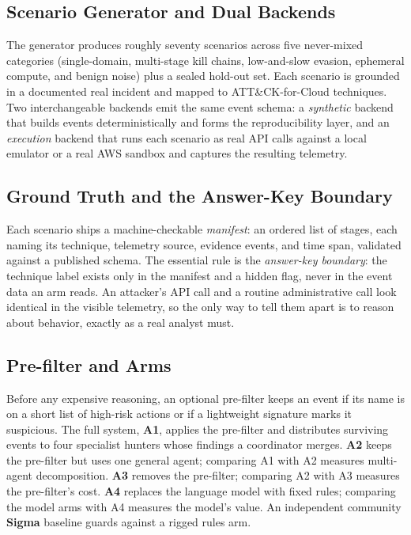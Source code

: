 \documentclass[journal]{IEEEtran}
\begin{document}
\subsection{Scenario Generator and Dual Backends}
The generator produces roughly seventy scenarios across five never-mixed categories (single-domain,
multi-stage kill chains, low-and-slow evasion, ephemeral compute, and benign noise) plus a sealed
hold-out set. Each scenario is grounded in a documented real incident and mapped to ATT\&CK-for-Cloud
techniques. Two interchangeable backends emit the same event schema: a \emph{synthetic} backend that
builds events deterministically and forms the reproducibility layer, and an \emph{execution} backend
that runs each scenario as real API calls against a local emulator or a real AWS sandbox and captures
the resulting telemetry.

\subsection{Ground Truth and the Answer-Key Boundary}
Each scenario ships a machine-checkable \emph{manifest}: an ordered list of stages, each naming its
technique, telemetry source, evidence events, and time span, validated against a published schema. The
essential rule is the \emph{answer-key boundary}: the technique label exists only in the manifest and
a hidden flag, never in the event data an arm reads. An attacker's API call and a routine
administrative call look identical in the visible telemetry, so the only way to tell them apart is to
reason about behavior, exactly as a real analyst must.

\subsection{Pre-filter and Arms}
Before any expensive reasoning, an optional pre-filter keeps an event if its name is on a short list
of high-risk actions or if a lightweight signature marks it suspicious. The full system, \textbf{A1},
applies the pre-filter and distributes surviving events to four specialist hunters whose findings a
coordinator merges. \textbf{A2} keeps the pre-filter but uses one general agent; comparing A1 with A2
measures multi-agent decomposition. \textbf{A3} removes the pre-filter; comparing A2 with A3 measures
the pre-filter's cost. \textbf{A4} replaces the language model with fixed rules; comparing the model
arms with A4 measures the model's value. An independent community \textbf{Sigma} baseline guards
against a rigged rules arm.
\end{document}
